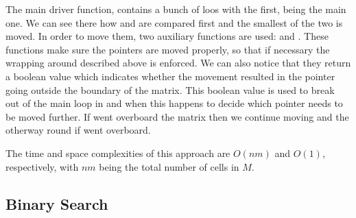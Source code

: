 The main driver function,  contains a bunch of loos with the first, being the main one. We can see there how  and  are compared first and the smallest of the two is moved. In order to move them, two auxiliary functions are used:  and . These functions make sure the pointers are moved properly, so that if necessary the wrapping around described above is enforced. We can also notice that they return a boolean value which indicates whether the movement resulted in the pointer going outside the boundary of the matrix.
This boolean value is used to break out of the main loop in  and when this happens to decide which pointer needs to be moved further. If  went overboard the matrix then we continue moving  and the otherway round if  went overboard.

The time and space complexities of this approach are $O(nm)$ and $O(1)$, respectively, with $nm$ being the total number of cells in $M$.

\subsection{Binary Search}
\label{kth_smallest_in_sorted_matrix:sec:binarysearch}


